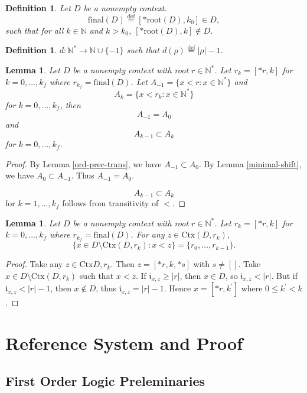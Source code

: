 \documentclass[10pt]{article}
\theoremstyle{plain}
\newtheorem{definition}[theorem]{Definition}
\newtheorem{lemma}[theorem]{Lemma}
\newcommand{\defeq}{\stackrel{\mathrm{def}}{=}}
\renewcommand{\i}{\mathfrak{i}}
\newcommand{\N}{\mathbb{N}}
\renewcommand{\root}{\text{root}}
\newcommand{\final}{\text{final}}
\newcommand{\context}{\text{Ctx}}
\begin{document}
\begin{definition}
Let $D$ be a nonempty context.
\begin{equation}
\final(D) \defeq [*\root(D), k_0]\in D,
\end{equation}
such that for all $k\in\N$ and $k > k_0$, $[*\root(D), k]\not\in D$.
\end{definition}

\begin{definition}
$d:\N^*\to\N \cup \{ -1 \}$ such that $d(\rho) \defeq |\rho| - 1$.
\end{definition}

\begin{lemma}
\label{base-reference-inclusions}
Let $D$ be a nonempty context with root $r\in\N^*$.
Let $r_k = [*r, k]$ for $k=0,\dots, k_f$ where $r_{k_f} = \final(D)$.
Let $A_{-1} = \{x < r: x\in\N^*\}$ and
$$
A_k = \{x < r_k: x\in\N^*\}
$$
for $k=0,\dots, k_f$, then
$$A_{-1} = A_0$$
and
$$A_{k-1} \subset A_k$$ for $k=0,\dots, k_f$.
\end{lemma}
\begin{proof}
By Lemma \ref{ord-prec-trans}, we have $A_{-1} \subset A_0$.
By Lemma \ref{minimal-shift}, we have $A_0 \subset A_{-1}$. Thus $A_{-1} = A_0$.

$$A_{k-1} \subset A_k$$ for $k=1,\dots, k_f$ follows from transitivity of $<$.

\end{proof}
\begin{lemma}
\label{first-level-references}
Let $D$ be a nonempty context with root $r\in\N^*$.
Let $r_k = [*r, k]$ for $k=0,\dots, k_f$ where $r_{k_f} = \final(D)$.
For any $z\in \context(D, r_k)$,
$$
\{ x\in D\setminus \context(D, r_k): x < z \} = \{r_0, \dots, r_{k-1}\}. 
$$
\end{lemma}
\begin{proof}
Take any $z\in \context{D, r_k}$.
Then $z = [*r, k, *s]$ with $s\not=[]$. Take $x\in D\setminus \context(D, r_k)$ such that $x < z$. If $\i_{x, z} \geq |r|$, then $x\in D$, so $\i_{x, z} < |r|$. 
But if $\i_{x, z} < |r| - 1$, then $x\not\in D$, thus $\i_{x, z} = |r| - 1$.
Hence $x = [*r, k^\prime]$ where $0\leq k^\prime < k$.   
\end{proof}


\section{Reference System and Proof}
\label{reference-proof}

\subsection{First Order Logic Preleminaries}
\end{document}
